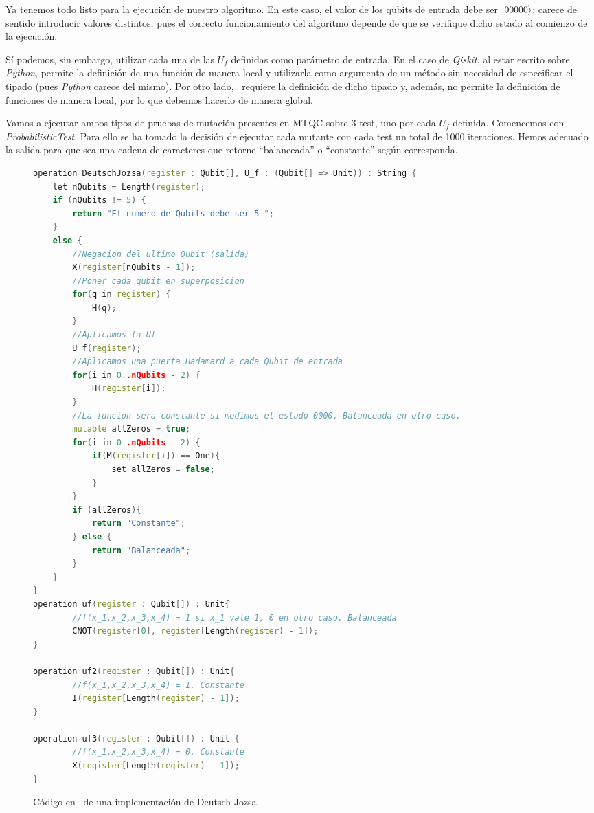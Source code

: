 Ya tenemos todo listo para la ejecución de nuestro algoritmo. En este caso, el valor de los qubits de entrada debe ser $\left|00000\right\rangle$; carece de sentido introducir valores distintos, pues el correcto funcionamiento del algoritmo depende de que se verifique dicho estado al comienzo de la ejecución.

Sí podemos, sin embargo, utilizar cada una de las $U_f$ definidas como parámetro de entrada. En el caso de \textit{Qiskit}, al estar escrito sobre \textit{Python}, permite la definición de una función de manera local y utilizarla como argumento de un método sin necesidad de especificar el tipado (pues \textit{Python} carece del mismo). Por otro lado, \qsh\ requiere la definición de dicho tipado y, además, no permite la definición de funciones de manera local, por lo que debemos hacerlo de manera global.

Vamos a ejecutar ambos tipos de pruebas de mutación presentes en MTQC sobre 3 test, uno por cada $U_f$ definida. Comencemos con \textit{ProbabilisticTest}. Para ello se ha tomado la decisión de ejecutar cada mutante con cada test un total de 1000 iteraciones. Hemos adecuado la salida para que sea una cadena de caracteres que retorne ``balanceada'' o ``constante'' según corresponda.

\begin{figure}[!htb]
\begin{lstlisting}[language=c++]
operation DeutschJozsa(register : Qubit[], U_f : (Qubit[] => Unit)) : String {
	let nQubits = Length(register);
    if (nQubits != 5) {
   		return "El numero de Qubits debe ser 5 ";
    }
    else {
    	//Negacion del ultimo Qubit (salida)
        X(register[nQubits - 1]); 
        //Poner cada qubit en superposicion
        for(q in register) {
        	H(q);
        }         
        //Aplicamos la Uf
        U_f(register);
        //Aplicamos una puerta Hadamard a cada Qubit de entrada
        for(i in 0..nQubits - 2) {
        	H(register[i]);
        }        
        //La funcion sera constante si medimos el estado 0000. Balanceada en otro caso.
        mutable allZeros = true;
        for(i in 0..nQubits - 2) {
           	if(M(register[i]) == One){
            	set allZeros = false;
            }
        } 
        if (allZeros){
        	return "Constante";
        } else {
        	return "Balanceada";
        }
	}
}
operation uf(register : Qubit[]) : Unit{
		//f(x_1,x_2,x_3,x_4) = 1 si x_1 vale 1, 0 en otro caso. Balanceada
		CNOT(register[0], register[Length(register) - 1]);
}

operation uf2(register : Qubit[]) : Unit{
		//f(x_1,x_2,x_3,x_4) = 1. Constante
		I(register[Length(register) - 1]);
}

operation uf3(register : Qubit[]) : Unit { 
		//f(x_1,x_2,x_3,x_4) = 0. Constante  
		X(register[Length(register) - 1]);
}
\end{lstlisting}
\caption{Código en \qsh\ de una implementación de Deutsch-Jozsa.}
\label{fig:code63}
\end{figure}

